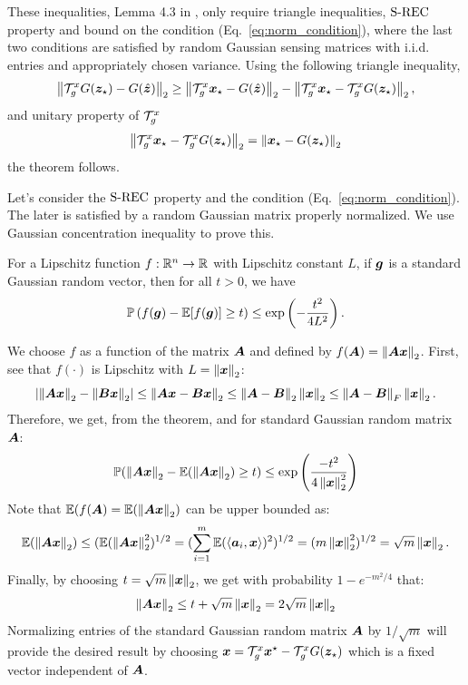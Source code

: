 These inequalities, Lemma 4.3 in \citet{Bora2017-as}, only require triangle inequalities, $\text{S-REC}$  property and bound on the condition (Eq.~\ref{eq:norm_condition}), where the last two conditions are satisfied by random Gaussian sensing matrices with i.i.d. entries and appropriately chosen variance. Using the following triangle inequality,
\begin{equation}
    \left\|{\mathcal{T}}_g^x G({\bm{z}}_\star)- G(\hat{{\bm{z}}})\right\|_2\geq \left\|{\mathcal{T}}_g^x{\bm{x}}_\star- G(\hat{{\bm{z}}})\right\|_2 -\left\|{\mathcal{T}}_g^x{\bm{x}}_\star - {\mathcal{T}}_g^x G({\bm{z}}_\star)\right\|_2,
\end{equation}
and unitary property of ${\mathcal{T}}_g^x$
\begin{equation}
\left\|{\mathcal{T}}_g^x{\bm{x}}_\star-{\mathcal{T}}_g^x G({\bm{z}}_\star)\right\|_2  = \left\|{\bm{x}}_\star-  G({\bm{z}}_\star)\right\|_2
\end{equation}
the theorem follows. 


Let's consider the $\text{S-REC}$  property and the condition (Eq.~\ref{eq:norm_condition}). The later is satisfied by a random Gaussian matrix properly normalized. We use Gaussian concentration inequality to prove this.

\begin{theorem}
For a Lipschitz function $f:\mathbb{R}^n\to\mathbb{R}$ with Lipschitz constant $L$, if ${\bm{g}}$ is a standard Gaussian random vector, then for all $t>0$, we have
\[
\mathbb{P}\left(f({\bm{g}})-\mathbb{E}[f({\bm{g}})]\geq t\right)\leq \exp\left(-\frac{t^2}{4L^2}\right).
\]
\end{theorem}
We choose $f$ as a function of the matrix ${\bm{A}}$ and defined by $f({\bm{A}})=\left\|{\bm{A}}{\bm{x}}\right\|_2$. First, see that $f(\cdot)$ is Lipschitz with $L=\left\|{\bm{x}}\right\|_2$:
\[
\left|\left\|{\bm{A}}{\bm{x}}\right\|_2 - \left\|{\bm{B}}{\bm{x}}\right\|_2 \right|\leq \left\|{\bm{A}}{\bm{x}}-{\bm{B}}{\bm{x}}\right\|_2\leq \left\|{\bm{A}}-{\bm{B}}\right\|_2 \left\|{\bm{x}}\right\|_2\leq    \left\|{\bm{A}}-{\bm{B}}\right\|_F \left\|{\bm{x}}\right\|_2.
\]
Therefore, we get, from the theorem, and for standard Gaussian random matrix ${\bm{A}}$:
\[
\mathbb{P}(\left\|{\bm{A}}{\bm{x}}\right\|_2-\mathbb{E}(\left\|{\bm{A}}{\bm{x}}\right\|_2)\geq t)\leq \exp{\left(\frac{-t^2}{4\left\|{\bm{x}}\right\|^2_2}\right)}
\]
Note that $\mathbb{E}(f({\bm{A}})=\mathbb{E}(\left\|{\bm{A}}{\bm{x}}\right\|_2)$ can be upper bounded as: 
\[
\mathbb{E}(\left\|{\bm{A}}{\bm{x}}\right\|_2)\leq (\mathbb{E}(\left\|{\bm{A}}{\bm{x}}\right\|^2_2)^{1/2}=  (\sum_{i=1}^m \mathbb{E}(\left\langle{\bm{a}}_i,{\bm{x}}\right\rangle)^2)^{1/2}  = (m\left\|{\bm{x}}\right\|^2_2)^{1/2}=\sqrt{m}\left\|{\bm{x}}\right\|_2.
\]
Finally, by choosing $t= \sqrt{m}\left\|{\bm{x}}\right\|_2$, we get with probability $1-e^{-m^2/4}$ that:
\[
\left\|{\bm{A}}{\bm{x}}\right\|_2\leq t + \sqrt{m}\left\|{\bm{x}}\right\|_2 = 2 \sqrt{m}\left\|{\bm{x}}\right\|_2 
\]
Normalizing entries of the standard Gaussian random matrix ${\bm{A}}$ by $1/\sqrt{m}$ will provide the desired result by choosing ${\bm{x}} = {\mathcal{T}}_g^x {\bm{x}}^\star-{\mathcal{T}}_g^x G({\bm{z}}_\star)$ which is a fixed vector independent of ${\bm{A}}$.

